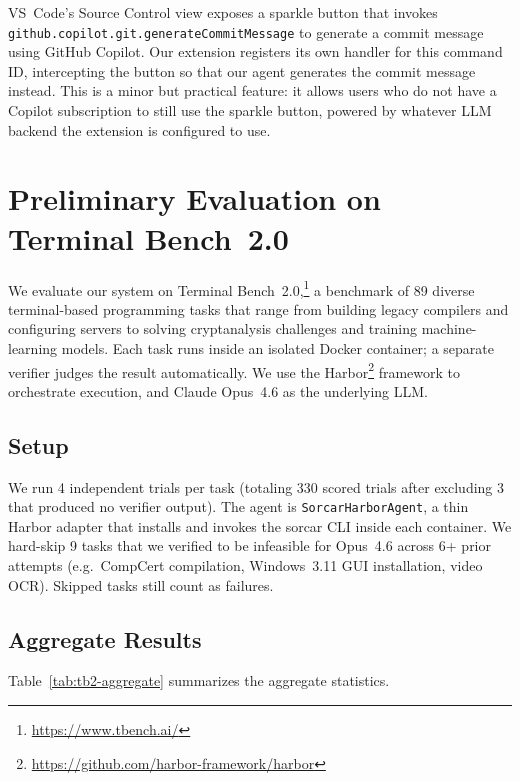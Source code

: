 \documentclass{article}
\begin{document}
VS~Code's Source Control view exposes a sparkle button that invokes
\texttt{github.copilot.git.generateCommitMessage} to generate a
commit message using GitHub Copilot.  Our extension registers its own
handler for this command ID, intercepting the button so that our
agent generates the commit message instead.  This is a minor but
practical feature: it allows users who do not have a Copilot
subscription to still use the sparkle button, powered by whatever
LLM backend the extension is configured to use.

\section{Preliminary Evaluation on Terminal Bench~2.0}
\label{sec:evaluation}

We evaluate our system on Terminal
Bench~2.0,\footnote{\url{https://www.tbench.ai/}} a benchmark of 89
diverse terminal-based programming tasks that range from building
legacy compilers and configuring servers to solving cryptanalysis
challenges and training machine-learning models.  Each task runs
inside an isolated Docker container; a separate verifier judges the
result automatically.  We use the
Harbor\footnote{\url{https://github.com/harbor-framework/harbor}}
framework to orchestrate execution, and Claude Opus~4.6 as the
underlying LLM.

\subsection{Setup}

We run 4 independent trials per task (totaling 330 scored trials after
excluding 3 that produced no verifier output).  The agent is
\texttt{SorcarHarborAgent}, a thin Harbor adapter that installs and
invokes the sorcar CLI inside each container.  We hard-skip 9 tasks
that we verified to be infeasible for Opus~4.6 across 6+ prior
attempts (e.g.\ CompCert compilation, Windows~3.11 GUI installation,
video OCR).  Skipped tasks still count as failures.

\subsection{Aggregate Results}

Table~\ref{tab:tb2-aggregate} summarizes the aggregate statistics.
\end{document}
